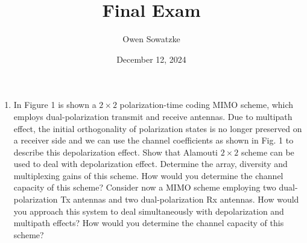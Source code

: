 \documentclass[fleqn]{article}
\title{Final Exam}
\author{Owen Sowatzke}
\date{December 12, 2024}
\newcommand{\zerodisplayskip}{
	\setlength{\abovedisplayskip}{0pt}%
	\setlength{\belowdisplayskip}{0pt}%
	\setlength{\abovedisplayshortskip}{0pt}%
	\setlength{\belowdisplayshortskip}{0pt}%
	\setlength{\mathindent}{0pt}}
\begin{document}
	\offinterlineskip
	\setlength{\lineskip}{12pt}
	\setcounter{MaxMatrixCols}{20}
	\zerodisplayskip
	\maketitle
	
	\begin{enumerate}
		\item In Figure 1 is shown a $2 \times 2$ polarization-time coding MIMO scheme, which employs dual-polarization transmit and receive antennas. Due to multipath effect, the initial orthogonality of polarization states is no longer preserved on a receiver side and we can use the channel coefficients as shown in Fig. 1 to describe this depolarization effect. Show that Alamouti $2 \times 2$ scheme can be used to deal with depolarization effect. Determine the array, diversity and multiplexing gains of this scheme. How would you determine the channel capacity of this scheme? Consider now a MIMO scheme employing two dual-polarization Tx antennas and two dual-polarization Rx antennas. How would you approach this system to deal simultaneously with depolarization and multipath effects? How would you determine the channel capacity of this scheme?

		\begin{figure}[H]
			\centerline{}
			\caption{}
			\label{fig::2x2_polarization_time_coding_mimo}
		\end{figure}
		

\end{enumerate}
\end{document}
